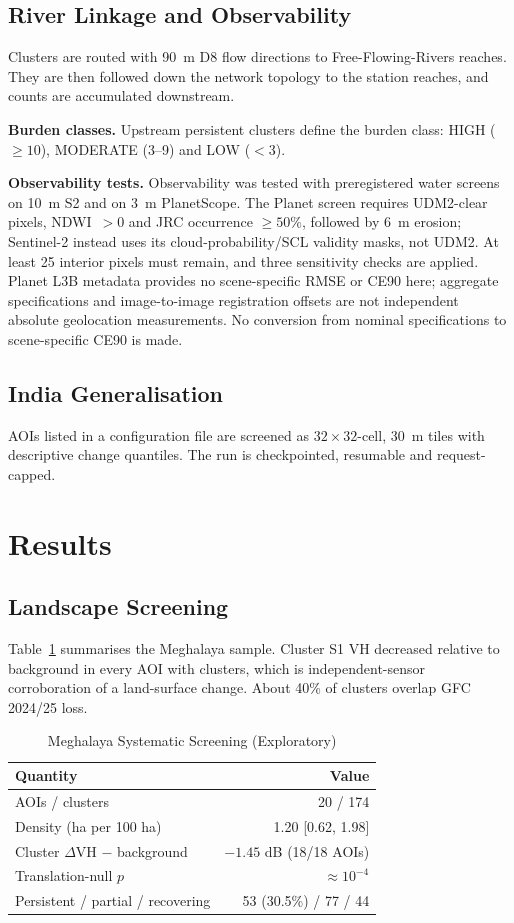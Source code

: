 \documentclass[conference]{IEEEtran}
\begin{document}
\subsection{River Linkage and Observability}
Clusters are routed with 90~m D8 flow directions to Free-Flowing-Rivers reaches. They are then followed down the network topology to the station reaches, and counts are accumulated downstream.

\textbf{Burden classes.} Upstream persistent clusters define the burden class: HIGH ($\ge10$), MODERATE (3--9) and LOW ($<3$).

\textbf{Observability tests.} Observability was tested with preregistered water screens on 10~m S2 and on 3~m PlanetScope. The Planet screen requires UDM2-clear pixels, NDWI~$>0$ and JRC occurrence $\ge50\%$, followed by 6~m erosion; Sentinel-2 instead uses its cloud-probability/SCL validity masks, not UDM2. At least 25 interior pixels must remain, and three sensitivity checks are applied. Planet L3B metadata provides no scene-specific RMSE or CE90 here; aggregate specifications and image-to-image registration offsets are not independent absolute geolocation measurements. No conversion from nominal specifications to scene-specific CE90 is made.

\subsection{India Generalisation}
AOIs listed in a configuration file are screened as $32\times32$-cell, 30~m tiles with descriptive change quantiles. The run is checkpointed, resumable and request-capped.

\section{Results}
\subsection{Landscape Screening}
Table~\ref{tab:land} summarises the Meghalaya sample. Cluster S1 VH decreased relative to background in every AOI with clusters, which is independent-sensor corroboration of a land-surface change. About 40\% of clusters overlap GFC 2024/25 loss.

\begin{table}[t]
\caption{Meghalaya Systematic Screening (Exploratory)}
\label{tab:land}
\centering
\begin{tabular}{@{}lr@{}}
\toprule
Quantity & Value \\
\midrule
AOIs / clusters & 20 / 174 \\
Density (ha per 100 ha) & 1.20 [0.62, 1.98] \\
Cluster $\Delta$VH $-$ background & $-1.45$ dB (18/18 AOIs) \\
Translation-null $p$ & $\approx 10^{-4}$ \\
Persistent / partial / recovering & 53 (30.5\%) / 77 / 44 \\
\bottomrule
\end{tabular}
\end{table}
\end{document}
